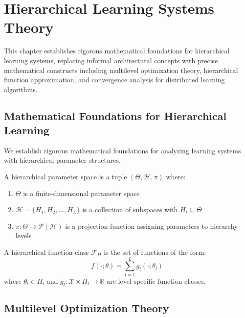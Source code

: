 \chapter{Hierarchical Learning Systems Theory}

\begin{tcolorbox}[colback=DarkSkyBlue!5!white,colframe=DarkSkyBlue!75!black,title=Chapter Summary]
This chapter establishes rigorous mathematical foundations for hierarchical learning systems, replacing informal architectural concepts with precise mathematical constructs including multilevel optimization theory, hierarchical function approximation, and convergence analysis for distributed learning algorithms.
\end{tcolorbox}

\section{Mathematical Foundations for Hierarchical Learning}

We establish rigorous mathematical foundations for analyzing learning systems with hierarchical parameter structures.

\begin{definition}
\label{def:hierarchical_parameter_space}
A hierarchical parameter space is a tuple $(\Theta, \mathcal{H}, \pi)$ where:
\begin{enumerate}
\item $\Theta$ is a finite-dimensional parameter space
\item $\mathcal{H} = \{H_1, H_2, \ldots, H_L\}$ is a collection of subspaces with $H_l \subseteq \Theta$
\item $\pi: \Theta \to \mathcal{P}(\mathcal{H})$ is a projection function assigning parameters to hierarchy levels
\end{enumerate}
\end{definition}

\begin{definition}
\label{def:hierarchical_function_class}
A hierarchical function class $\mathcal{F}_H$ is the set of functions of the form:
$$f(\cdot; \theta) = \sum_{l=1}^L g_l(\cdot; \theta_l)$$
where $\theta_l \in H_l$ and $g_l: \mathcal{X} \times H_l \to \mathbb{R}$ are level-specific function classes.
\end{definition}

\section{Multilevel Optimization Theory}

